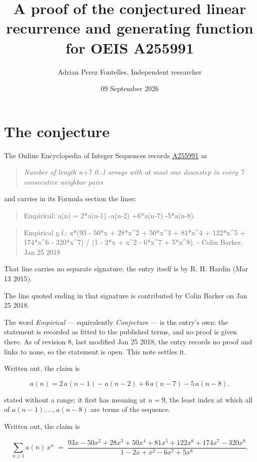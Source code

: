 \documentclass[11pt]{article}
\title{A proof of the conjectured linear recurrence and generating function for OEIS A255991}
\author{Adrian Perez Fontelles, Independent researcher}
\date{09 September 2026}
\theoremstyle{definition}
\begin{document}
\maketitle
\section{The conjecture}

The Online Encyclopedia of Integer Sequences records \href{https://oeis.org/A255991}{A255991} as

\begin{quote}\itshape Number of length n+7 0..1 arrays with at most one downstep in every 7 consecutive neighbor pairs\end{quote}

and carries in its Formula section the lines:

\begin{quote}\ttfamily Empirical: a(n) = 2*a(n-1) -a(n-2) +6*a(n-7) -5*a(n-8).\end{quote}

\begin{quote}\ttfamily Empirical g.f.: x*(93 - 50*x + 28*x\textasciicircum{}2 + 50*x\textasciicircum{}3 + 81*x\textasciicircum{}4 + 122*x\textasciicircum{}5 + 174*x\textasciicircum{}6 - 320*x\textasciicircum{}7) / (1 - 2*x + x\textasciicircum{}2 - 6*x\textasciicircum{}7 + 5*x\textasciicircum{}8). - Colin Barker, Jan 25 2018\end{quote}

That line carries no separate signature; the entry itself is by R. H. Hardin (Mar 13 2015).

The line quoted ending in that signature is contributed by Colin Barker on Jan 25 2018.

The word {\itshape Empirical} --- equivalently {\itshape Conjecture} --- is the entry's own: the statement is recorded as fitted to the published terms, and no proof is given there. As of revision 8, last modified Jan 25 2018, the entry records no proof and links to none, so the statement is open. This note settles it.

Written out, the claim is

\[a(n) = 2\,a(n-1) - a(n-2) + 6\,a(n-7) - 5\,a(n-8).\]

stated without a range; it first has meaning at $n = 9$, the least index at which all of $a(n-1),\dots,a(n-8)$ are terms of the sequence.

Written out, the claim is

\[\sum_{n \ge 1} a(n)\,x^n \;=\; \frac{93x - 50x^{2} + 28x^{3} + 50x^{4} + 81x^{5} + 122x^{6} + 174x^{7} - 320x^{8}}{1 - 2x + x^{2} - 6x^{7} + 5x^{8}}.\]
\end{document}

